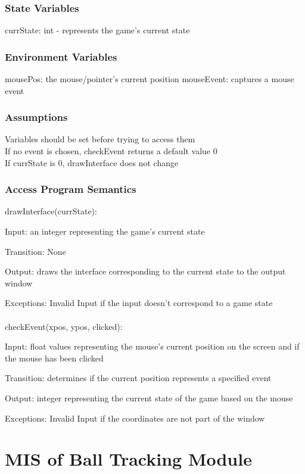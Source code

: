 \documentclass[12pt, titlepage]{article}
\begin{document}
		\subsubsection{State Variables}
		currState: int - represents the game's current state
		
		\subsubsection{Environment Variables}
		mousePos: the mouse/pointer's current position
		mouseEvent: captures a mouse event 
		\subsubsection{Assumptions}
		Variables should be set before trying to access them \\ 
		If no event is chosen, checkEvent returns a default value 0 \\
		If currState is 0, drawInterface does not change \\
		
		\subsubsection{Access Program Semantics}
		drawInterface(currState):
		
		Input: an integer representing the game's current state
		
		Transition: None
		
		Output: draws the interface corresponding to the current state to the output window
		
		Exceptions: Invalid Input if the input doesn't correspond to a game state\\
		\\
		checkEvent(xpos, ypos, clicked):
		
		Input: float values representing the mouse's current position on the screen and if the mouse has been clicked
		
		Transition: determines if the current position represents a specified event
		
		Output: integer representing the current state of the game based on the mouse
		
		Exceptions: Invalid Input if the coordinates are not part of the window
		
	
\section{MIS of Ball Tracking Module}
\end{document}
